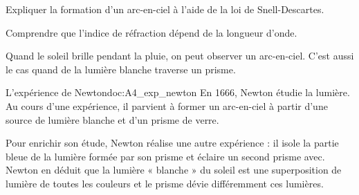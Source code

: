 \teteSndLumi
\vspace*{-30pt}



\begin{objectifs}
  \item Expliquer la formation d'un arc-en-ciel à l'aide de la loi de Snell-Descartes.
  \item Comprendre que l'indice de réfraction dépend de la longueur d'onde.
\end{objectifs}

\begin{contexte}
  Quand le soleil brille pendant la pluie, on peut observer un arc-en-ciel.
  C'est aussi le cas quand de la lumière blanche traverse un prisme.
  
\end{contexte}


\begin{doc}{L'expérience de Newton}{doc:A4_exp_newton}
  En 1666, Newton étudie la lumière.
  Au cours d'une expérience, il parvient à former un arc-en-ciel à partir d'une source de lumière blanche et d'un prisme de verre.
 
  Pour enrichir son étude, Newton réalise une autre expérience : il isole la partie bleue de la lumière formée par son prisme et éclaire un second prisme avec.
  Newton en déduit que la lumière « blanche » du soleil est une superposition de lumière de toutes les couleurs et le prisme dévie différemment ces lumières.
  
  \vspace*{-8pt}
  \begin{center}
  \end{center}
\end{doc}

